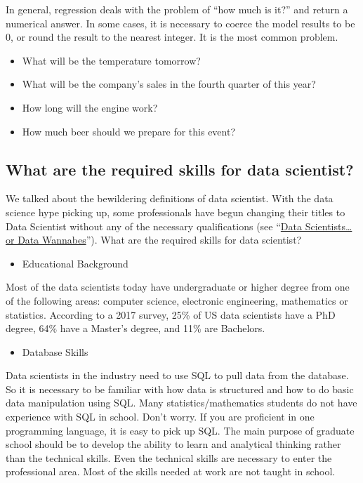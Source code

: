 \documentclass[
]{article}
\providecommand{\tightlist}{%
  \setlength{\itemsep}{0pt}\setlength{\parskip}{0pt}}
\begin{document}
In general, regression deals with the problem of ``how much is it?'' and
return a numerical answer. In some cases, it is necessary to coerce the
model results to be 0, or round the result to the nearest integer. It is
the most common problem.

\begin{itemize}
\tightlist
\item
  What will be the temperature tomorrow?
\item
  What will be the company's sales in the fourth quarter of this year?
\item
  How long will the engine work?
\item
  How much beer should we prepare for this event?
\end{itemize}

\hypertarget{what-are-the-required-skills-for-data-scientist}{%
\subsection{What are the required skills for data
scientist?}\label{what-are-the-required-skills-for-data-scientist}}

We talked about the bewildering definitions of data scientist. With the
data science hype picking up, some professionals have begun changing
their titles to Data Scientist without any of the necessary
qualifications (see
``\href{http://www.burtchworks.com/2013/06/12/data-scientists-or-data-wannabes/}{Data
Scientists\ldots or Data Wannabes}''). What are the required skills for
data scientist?

\begin{itemize}
\tightlist
\item
  Educational Background
\end{itemize}

Most of the data scientists today have undergraduate or higher degree
from one of the following areas: computer science, electronic
engineering, mathematics or statistics. According to a 2017 survey, 25\%
of US data scientists have a PhD degree, 64\% have a Master's degree,
and 11\% are Bachelors.

\begin{itemize}
\tightlist
\item
  Database Skills
\end{itemize}

Data scientists in the industry need to use SQL to pull data from the
database. So it is necessary to be familiar with how data is structured
and how to do basic data manipulation using SQL. Many
statistics/mathematics students do not have experience with SQL in
school. Don't worry. If you are proficient in one programming language,
it is easy to pick up SQL. The main purpose of graduate school should be
to develop the ability to learn and analytical thinking rather than the
technical skills. Even the technical skills are necessary to enter the
professional area. Most of the skills needed at work are not taught in
school.
\end{document}
